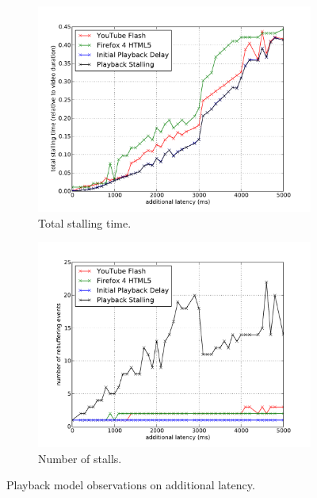 \begin{figure}[htbp]
	\centering
    	\begin{subfigure}[htbb]{0.9\textwidth}
            \centering
            \includegraphics[width=\textwidth]{images/eval-latency-stallingtime.pdf}
            \caption{Total stalling time.}
            \label{c3:fig:eval-latency-stallingtime}
        \end{subfigure}

    	\begin{subfigure}[htbp]{0.9\textwidth}
            \centering
            \includegraphics[width=\textwidth]{images/eval-latency-frequency.pdf}
            \caption{Number of stalls.}
            \label{c3:fig:eval-latency-numstalls}
        \end{subfigure}
	\caption{Playback model observations on additional latency.}
	\label{c3:fig:eval-latency}
\end{figure}



